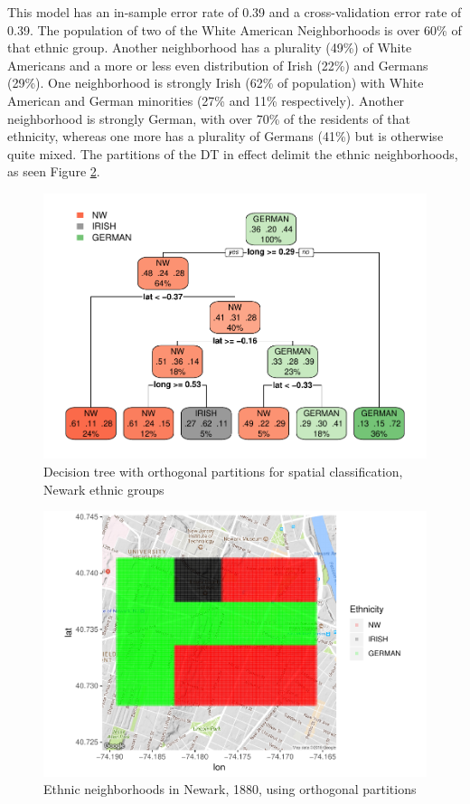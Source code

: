 \documentclass[]{elsarticle} %
\makeatletter
\def\maxwidth{\ifdim\Gin@nat@width>\linewidth\linewidth
\else\Gin@nat@width\fi}
\let\Oldincludegraphics\includegraphics
\renewcommand{\includegraphics}[1]{\Oldincludegraphics[width=\maxwidth]{#1}}
\makeatother
\begin{document}
This model has an in-sample error rate of 0.39 and a cross-validation
error rate of 0.39. The population of two of the White American
Neighborhoods is over 60\% of that ethnic group. Another neighborhood
has a plurality (49\%) of White Americans and a more or less even
distribution of Irish (22\%) and Germans (29\%). One neighborhood is
strongly Irish (62\% of population) with White American and German
minorities (27\% and 11\% respectively). Another neighborhood is
strongly German, with over 70\% of the residents of that ethnicity,
whereas one more has a plurality of Germans (41\%) but is otherwise
quite mixed. The partitions of the DT in effect delimit the ethnic
neighborhoods, as seen Figure \ref{fig:fig18-map-orthogonal-newark}.

\begin{figure}
\centering
\includegraphics{Trees_with_Base_Functions_v3_files/figure-latex/fig17-tree-orthogonal-newark-1.pdf}
\caption{\label{fig:fig17-tree-orthogonal-newark}Decision tree with
orthogonal partitions for spatial classification, Newark ethnic groups}
\end{figure}

\begin{figure}
\centering
\includegraphics{Trees_with_Base_Functions_v3_files/figure-latex/fig18-map-orthogonal-newark-1.pdf}
\caption{\label{fig:fig18-map-orthogonal-newark}Ethnic neighborhoods in
Newark, 1880, using orthogonal partitions}
\end{figure}
\end{document}
